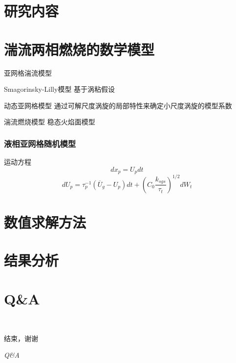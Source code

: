 \documentclass[compress]{beamer}%
\begin{document}
\section{研究内容}
\section{湍流两相燃烧的数学模型}
\begin{frame}{亚网格湍流模型}
  \begin{block}{Smagorinsky-Lilly模型}
    基于涡粘假设
  \end{block}
  \begin{block}{动态亚网格模型}
    通过可解尺度涡旋的局部特性来确定小尺度涡旋的模型系数
  \end{block}
\end{frame}
\begin{frame}{湍流燃烧模型}
稳态火焰面模型
\end{frame}
\begin{frame}
	\frametitle{液相亚网格随机模型}
	\begin{block}{运动方程}
		$$dx_p=U_pdt$$
	\[dU_p=\tau_p^{-1}( {\overline U}_g-U_p)dt+(C_0\frac{k_{sgs}}{\tau_t})^{1/2}dW_t\]
	\end{block}
\end{frame}
\section{数值求解方法}
\section{结果分析}
\section{Q\&A}
\begin{frame}{\secname~ }
	\begin{center}
 		\huge {\kaishu 结束，谢谢}
		
		\huge \textit {Q\&A}
	\end{center}
\end{frame}
\end{document}
